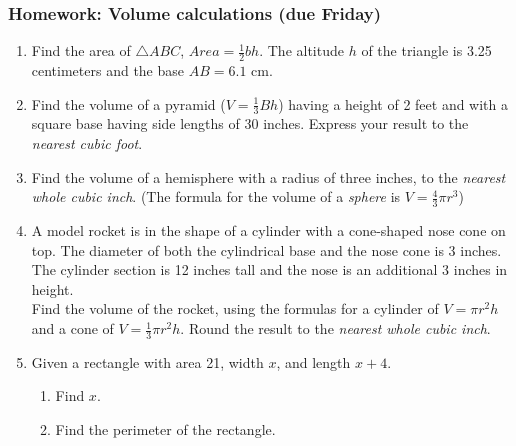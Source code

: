 \documentclass[12pt, twoside]{article}
\begin{document}
\subsubsection*{Homework: Volume calculations (due Friday)}
 \begin{enumerate}

   \item Find the area of $\triangle ABC$,  $Area= \frac{1}{2}bh$. The altitude $h$ of the triangle is 3.25 centimeters and the base $AB=6.1$ cm.\\[1cm]
    \vspace{2cm}

\item Find the volume of a pyramid ($V=\frac{1}{3}Bh$) having a height of 2 feet and with a square base having side lengths of 30 inches. Express your result to the \emph{nearest cubic foot}. \vspace{5cm}

\item Find the volume of a hemisphere with a radius of three inches, to the \emph{nearest whole cubic inch}. (The formula for the volume of a \emph{sphere} is $V=\frac{4}{3}\pi r^3$)

\newpage
\item A model rocket is in the shape of a cylinder with a cone-shaped nose cone on top. The diameter of both the cylindrical base and the nose cone is 3 inches. The cylinder section is 12 inches tall and the nose is an additional 3 inches in height. \\[0.5cm]
Find the volume of the rocket, using the formulas for a cylinder of $V=\pi r^2 h$ and a cone of $V=\frac{1}{3} \pi r^2 h$. Round the result to the \emph{nearest whole cubic inch}.  \vspace{8cm}

\item Given a rectangle with area 21, width $x$, and length $x+4$.
  \begin{enumerate}
    \item Find $x$. \vspace{4cm}
    \item Find the perimeter of the rectangle.
  \end{enumerate}

\end{enumerate}
\end{document}

